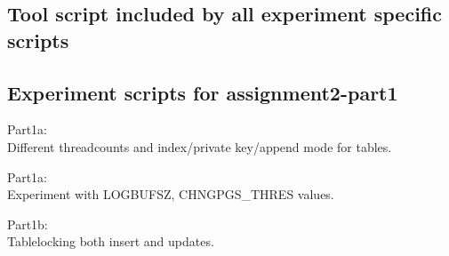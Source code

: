 \subsection{Tool script included by all experiment specific scripts}


\subsection{Experiment scripts for assignment2-part1}

Part1a:\\
Different threadcounts and index/private key/append mode for tables.

Part1a:\\
Experiment with LOGBUFSZ, CHNGPGS\_THRES values.

Part1b:\\
Tablelocking both insert and updates.



